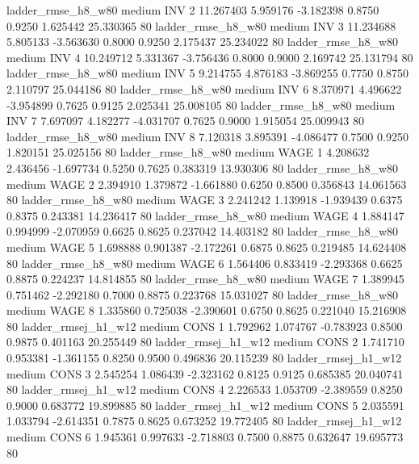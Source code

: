    ladder_rmse_h8_w80     medium      INV                 2 11.267403 5.959176 -3.182398 0.8750 0.9250  1.625442   25.330365 80
    ladder_rmse_h8_w80     medium      INV                 3 11.234688 5.805133 -3.563630 0.8000 0.9250  2.175437   25.234022 80
    ladder_rmse_h8_w80     medium      INV                 4 10.249712 5.331367 -3.756436 0.8000 0.9000  2.169742   25.131794 80
    ladder_rmse_h8_w80     medium      INV                 5  9.214755 4.876183 -3.869255 0.7750 0.8750  2.110797   25.044186 80
    ladder_rmse_h8_w80     medium      INV                 6  8.370971 4.496622 -3.954899 0.7625 0.9125  2.025341   25.008105 80
    ladder_rmse_h8_w80     medium      INV                 7  7.697097 4.182277 -4.031707 0.7625 0.9000  1.915054   25.009943 80
    ladder_rmse_h8_w80     medium      INV                 8  7.120318 3.895391 -4.086477 0.7500 0.9250  1.820151   25.025156 80
    ladder_rmse_h8_w80     medium     WAGE                 1  4.208632 2.436456 -1.697734 0.5250 0.7625  0.383319   13.930306 80
    ladder_rmse_h8_w80     medium     WAGE                 2  2.394910 1.379872 -1.661880 0.6250 0.8500  0.356843   14.061563 80
    ladder_rmse_h8_w80     medium     WAGE                 3  2.241242 1.139918 -1.939439 0.6375 0.8375  0.243381   14.236417 80
    ladder_rmse_h8_w80     medium     WAGE                 4  1.884147 0.994999 -2.070959 0.6625 0.8625  0.237042   14.403182 80
    ladder_rmse_h8_w80     medium     WAGE                 5  1.698888 0.901387 -2.172261 0.6875 0.8625  0.219485   14.624408 80
    ladder_rmse_h8_w80     medium     WAGE                 6  1.564406 0.833419 -2.293368 0.6625 0.8875  0.224237   14.814855 80
    ladder_rmse_h8_w80     medium     WAGE                 7  1.389945 0.751462 -2.292180 0.7000 0.8875  0.223768   15.031027 80
    ladder_rmse_h8_w80     medium     WAGE                 8  1.335860 0.725038 -2.390601 0.6750 0.8625  0.221040   15.216908 80
   ladder_rmsej_h1_w12     medium     CONS                 1  1.792962 1.074767 -0.783923 0.8500 0.9875  0.401163   20.255449 80
   ladder_rmsej_h1_w12     medium     CONS                 2  1.741710 0.953381 -1.361155 0.8250 0.9500  0.496836   20.115239 80
   ladder_rmsej_h1_w12     medium     CONS                 3  2.545254 1.086439 -2.323162 0.8125 0.9125  0.685385   20.040741 80
   ladder_rmsej_h1_w12     medium     CONS                 4  2.226533 1.053709 -2.389559 0.8250 0.9000  0.683772   19.899885 80
   ladder_rmsej_h1_w12     medium     CONS                 5  2.035591 1.033794 -2.614351 0.7875 0.8625  0.673252   19.772405 80
   ladder_rmsej_h1_w12     medium     CONS                 6  1.945361 0.997633 -2.718803 0.7500 0.8875  0.632647   19.695773 80
